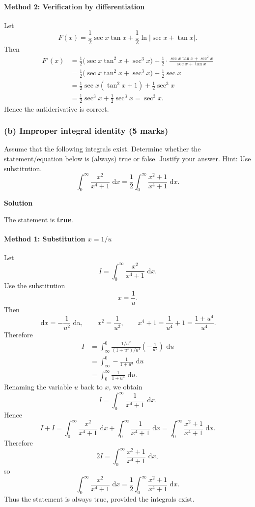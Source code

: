\documentclass[12pt]{article}
\newcommand{\dd}{\,\mathrm{d}}
\begin{document}
\paragraph{Method 2: Verification by differentiation}
Let
\[
F(x)=\frac{1}{2}\sec x\tan x+\frac{1}{2}\ln|\sec x+\tan x|.
\]
Then
\begin{align*}
F'(x)
&=\frac{1}{2}\bigl(\sec x\tan^2 x+\sec^3 x\bigr)
+\frac{1}{2}\cdot \frac{\sec x\tan x+\sec^2 x}{\sec x+\tan x} \\
&=\frac{1}{2}\bigl(\sec x\tan^2 x+\sec^3 x\bigr)+\frac{1}{2}\sec x \\
&=\frac{1}{2}\sec x(\tan^2 x+1)+\frac{1}{2}\sec^3 x \\
&=\frac{1}{2}\sec^3 x+\frac{1}{2}\sec^3 x
=\sec^3 x.
\end{align*}
Hence the antiderivative is correct.

\subsubsection{(b) Improper integral identity \hfill (5 marks)}

Assume that the following integrals exist. Determine whether the statement/equation below is (always) true or false. Justify your answer. Hint: Use substitution.
\[
\int_{0}^{\infty} \frac{x^2}{x^4+1}\,\dd x
=\frac{1}{2}\int_{0}^{\infty} \frac{x^2+1}{x^4+1}\,\dd x.
\]

\textbf{Solution}

The statement is \textbf{true}.

\paragraph{Method 1: Substitution \(x=1/u\)}
Let
\[
I=\int_{0}^{\infty} \frac{x^2}{x^4+1}\,\dd x.
\]
Use the substitution
\[
x=\frac{1}{u}.
\]
Then
\[
\dd x=-\frac{1}{u^2}\,\dd u,
\qquad
x^2=\frac{1}{u^2},
\qquad
x^4+1=\frac{1}{u^4}+1=\frac{1+u^4}{u^4}.
\]
Therefore
\begin{align*}
I
&=\int_{\infty}^{0} \frac{1/u^2}{(1+u^4)/u^4}\left(-\frac{1}{u^2}\right)\,\dd u \\
&=\int_{\infty}^{0} -\frac{1}{1+u^4}\,\dd u \\
&=\int_{0}^{\infty} \frac{1}{1+u^4}\,\dd u.
\end{align*}
Renaming the variable \(u\) back to \(x\), we obtain
\[
I=\int_{0}^{\infty} \frac{1}{x^4+1}\,\dd x.
\]
Hence
\[
I+I=\int_{0}^{\infty} \frac{x^2}{x^4+1}\,\dd x+\int_{0}^{\infty} \frac{1}{x^4+1}\,\dd x
=\int_{0}^{\infty} \frac{x^2+1}{x^4+1}\,\dd x.
\]
Therefore
\[
2I=\int_{0}^{\infty} \frac{x^2+1}{x^4+1}\,\dd x,
\]
so
\[
\boxed{\int_{0}^{\infty} \frac{x^2}{x^4+1}\,\dd x
=\frac{1}{2}\int_{0}^{\infty} \frac{x^2+1}{x^4+1}\,\dd x.}
\]
Thus the statement is always true, provided the integrals exist.
\end{document}
